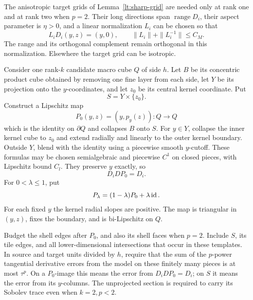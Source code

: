 The anisotropic target grids of Lemma~\ref{lt:sharp-grid} are needed
only at rank one and at rank two when $p=2$.  Their long directions
span $\operatorname{range}D_i$, their aspect parameter is $\eta>0$,
and a linear normalization $L_i$ can be chosen so that
\begin{equation}\label{la:normalization}
 L_iD_i(y,z)=(y,0),\qquad
 \|L_i\|+\|L_i^{-1}\|\le C_M.
\end{equation}
The range and its orthogonal complement remain orthogonal in this
normalization.  Elsewhere the target grid can be isotropic.

Consider one rank-$k$ candidate macro cube $Q$ of side $h$.  Let $B$
be its concentric product cube obtained by removing one fine layer
from each side, let $Y$ be its projection onto the $y$-coordinates,
and let $z_0$ be its central kernel coordinate.  Put
\[
 S=Y\times\{z_0\}.
\]
Construct a Lipschitz map
\begin{equation}\label{la:flat-collapse}
 P_0(y,z)=(y,p_y(z)):Q\longrightarrow Q
\end{equation}
which is the identity on $\partial Q$ and collapses $B$ onto $S$.
For $y\in Y$, collapse the inner kernel cube to $z_0$ and extend
radially and linearly to the outer kernel boundary.  Outside $Y$,
blend with the identity using a piecewise smooth $y$-cutoff.  These
formulas may be chosen semialgebraic and piecewise $C^1$ on closed
pieces, with Lipschitz bound $C_l$.  They preserve $y$ exactly, so
\begin{equation}\label{la:collapse-model-identity}
 D_iDP_0=D_i.
\end{equation}
For $0<\lambda\le1$, put
\begin{equation}\label{la:positive-collapse}
 P_\lambda=(1-\lambda)P_0+\lambda\operatorname{id}.
\end{equation}
For each fixed $y$ the kernel radial slopes are positive.  The map is
triangular in $(y,z)$, fixes the boundary, and is bi-Lipschitz on $Q$.

Budget the shell edges after $P_0$, and also its shell faces when
$p=2$.  Include $S$, its tile edges, and all lower-dimensional
intersections that occur in these templates.  In source and target
units divided by $h$, require that the sum of the $p$-power
tangential derivative errors from the model on these finitely many
pieces is at most $\tau^p$.  On a $P_0$-image this means the error
from $D_iDP_0=D_i$; on $S$ it means the error from its $y$-columns.
The unprojected section is required to carry its Sobolev trace even
when $k=2,p<2$.

